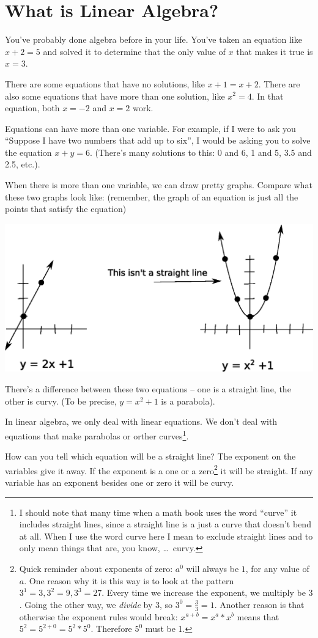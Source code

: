 \documentclass[a4paper,twoside,12pt]{memoir}  %
\begin{document}
\section{What is Linear Algebra?}
You've probably done algebra before in your life.
You've taken an equation like $x + 2 = 5$ and solved it to determine that
the only value of $x$ that makes it true is $x = 3$.

There are some equations that have no solutions, like $x + 1 = x + 2$.
There are also some equations that have more than one solution, like $x^2 = 4$.
In that equation, both $x = -2$ and $x = 2$ work.

Equations can have more than one variable.
For example, if I were to ask you ``Suppose I have two numbers that add up to six'', I would be asking you
to solve the equation $x + y = 6$. (There's many solutions to this: 0 and 6, 1 and 5, 3.5 and 2.5, etc.).

When there is more than one variable, we can draw pretty graphs.
Compare what these two graphs look like: (remember, the graph of an equation is just all the points that satisfy the equation)

\includegraphics[width=\linewidth]{linear-vs-nonlinear.eps}

There's a difference between these two equations -- one is a straight line, the other is curvy.
(To be precise, $y = x^2 + 1$ is a parabola).

In linear algebra, we only deal with linear equations.
We don't deal with equations that make parabolas or orther curves\footnote{I should note that many time when a math book uses the word ``curve'' it includes straight lines, since a straight line is a just a curve that doesn't bend at all. When I use the word curve here I mean to exclude straight lines and to only mean things that are, you know, \ldots\ curvy.}.

How can you tell which equation will be a straight line? The exponent on the variables give it away. If the exponent is a one or a zero\footnote{Quick reminder about exponents of zero: $a^0$ will always be $1$, for any value of $a$. One reason why it is this way is to look at the pattern $3^1 = 3, 3^2 = 9, 3^3 = 27$. Every time we increase the exponent, we multiply be $3$. Going the other way, we \textit{divide} by $3$, so $3^0 = \frac{3}{3} = 1$. Another reason is that otherwise the exponent rules would break: $x^{a+b} = x^a*x^b$ means that $5^2 = 5^{2+0} = 5^2*5^0$. Therefore $5^0$ must be 1.} it will be straight. If any variable has an exponent besides one or zero it will be curvy.
\end{document}
